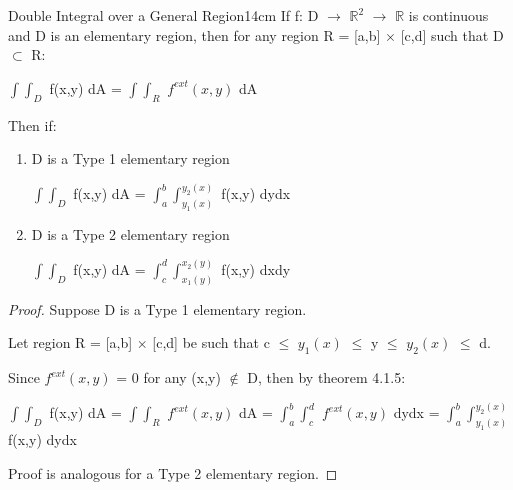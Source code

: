     \vspace{0.5cm}



    \begin{wtheorem}{Double Integral over a General Region}{14cm}
        If f: D $\rightarrow$ $\mathbb{R}^2$ $\rightarrow$ $\mathbb{R}$
        is continuous and D is an elementary region, then
        for any region R = [a,b] $\times$ [c,d] such that D $\subset$ R:

        \hspace{0.5cm}
        $\int \int_D$ f(x,y) dA
        = $\int \int_R$ $f^{ext}(x,y)$ dA

        Then if:

        \begin{enumerate}[label=(\alph*), leftmargin=1cm, itemsep=0.1cm]
            \item D is a Type 1 elementary region
            
                \hspace{0.5cm}
                $\int \int_D$ f(x,y) dA
                = $\int_a^b \int_{y_1(x)}^{y_2(x)}$ f(x,y) dydx

            \item D is a Type 2 elementary region
            
                \hspace{0.5cm}
                $\int \int_D$ f(x,y) dA
                = $\int_c^d \int_{x_1(y)}^{x_2(y)}$ f(x,y) dxdy
        \end{enumerate}
    \end{wtheorem}

    \begin{proof}
        Suppose D is a Type 1 elementary region.

        Let region R = [a,b] $\times$ [c,d] be such that
        c $\leq$ $y_1(x)$ $\leq$ y $\leq$ $y_2(x)$ $\leq$ d.

        Since $f^{ext}(x,y)$ = 0 for any
        (x,y) $\not \in$ D, then by {\color{red} theorem 4.1.5}:

        \hspace{0.2cm}
        $\int \int_D$ f(x,y) dA
        = $\int \int_R$ $f^{ext}(x,y)$ dA
        = $\int_a^b \int_c^d$ $f^{ext}(x,y)$ dydx
        = $\int_a^b \int_{y_1(x)}^{y_2(x)}$ f(x,y) dydx

        Proof is analogous for a Type 2 elementary region.
    \end{proof}

    \vspace{0.5cm}



